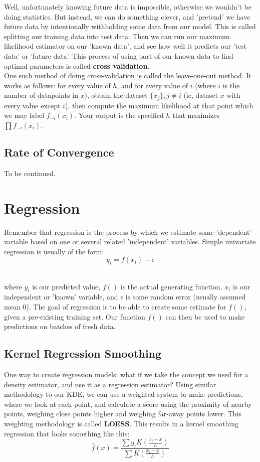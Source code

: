 \documentclass[12pt]{article}
\begin{document}
Well, unfortunately knowing future data is impossible, otherwise we wouldn't be doing statistics. But instead, we can do something clever, and 'pretend' we have future data by intentionally withholding some data from our model. This is called splitting our training data into test data. Then we can run our maximum likelihood estimator on our 'known data', and see how well it predicts our 'test data' or 'future data'. This process of using part of our known data to find optimal parameters is called \textbf{cross validation}. \\

One such method of doing cross-validation is called the leave-one-out method. It works as follows: for every value of $h$, and for every value of $i$ (where $i$ is the number of datapoints in $x$), obtain the dataset $\{x_j\}, j \neq i$ (ie, dataset $x$ with every value except $i$), then compute the maximum likelihood at that point which we may label $f_{-i}(x_i)$. Your output is the specified $h$ that maximizes $\prod f_{-i}(x_i)$.
\subsection{Rate of Convergence}
To be continued.
\section{Regression}
Remember that regression is the process by which we estimate some 'dependent' variable based on one or several related 'independent' variables. Simple univariate regression is usually of the form: 
$$y_i = f(x_i) + \epsilon $$ \

where $y_i$ is our predicted value, $f()$ is the actual generating function, $x_i$ is our independent or 'known' variable, and $\epsilon$ is some random error (usually assumed mean 0). The goal of regression is to be able to create some estimate for $f()$, given a pre-existing training set. Our function $f()$ can then be used to make predictions on batches of fresh data.\\
\subsection{Kernel Regression Smoothing}
One way to create regression models: what if we take the concept we used for a density estimator, and use it as a regression estimator? Using similar methodology to our KDE, we can use a weighted system to make predictions, where we look at each point, and calculate a score using the proximity of nearby points, weighing close points higher and weighing far-away points lower. This weighting methodology is called \textbf{LOESS}. This results in a kernel smoothing regression that looks something like this:
$$\hat{f}(x) = \frac { \sum y_i K (\frac{x_i-x}{h}) } { \sum K (\frac{x_i-x}{h}) } $$ \
\end{document}
